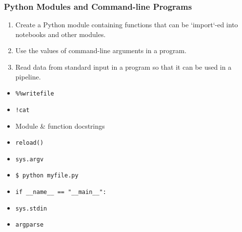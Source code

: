 \documentclass[xcolor=dvipsnames]{beamer}
\begin{document}
\begin{frame}
\frametitle{Python Modules and Command-line Programs}
\begin{enumerate}
  \item Create a Python module containing functions that can be `import`-ed into notebooks and other modules.
  \item Use the values of command-line arguments in a program.
  \item Read data from standard input in a program so that it can be used in a pipeline.
\end{enumerate}
\begin{multicols}{2}
\begin{itemize}
  \item {\tt \%\%writefile}
  \item {\tt !cat}
  \item Module \& function docstrings
  \item {\tt reload()}
  \item {\tt sys.argv}
  \item {\tt \$ python myfile.py}
  \item {\tt if \_\_name\_\_ == "\_\_main\_\_":}
  \item {\tt sys.stdin}
  \item {\tt argparse}
\end{itemize}
\end{multicols}
\end{frame}
\end{document}
